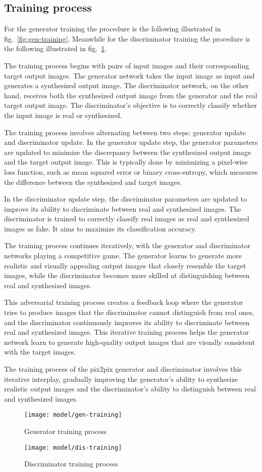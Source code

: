 \subsection{Training process}\label{subsec:training-process}
For the generator training the procedure is the following illustrated in fig.~\ref{fig:gen-training}, Meanwhile for the discriminator training the procedure is the following illustrated in fig.~\ref{fig:dis-training}.
\par
The training process begins with pairs of input images and their corresponding target output images. 
The generator network takes the input image as input and generates a synthesized output image. 
The discriminator network, on the other hand, receives both the synthesized output image from the generator and the real target output image. 
The discriminator's objective is to correctly classify whether the input image is real or synthesized.
\par
The training process involves alternating between two steps: generator update and discriminator update. 
In the generator update step, the generator parameters are updated to minimize the discrepancy between the synthesized output image and the target output image. 
This is typically done by minimizing a pixel-wise loss function, such as mean squared error or binary cross-entropy, which measures the difference between the synthesized and target images.
\par 
In the discriminator update step, the discriminator parameters are updated to improve its ability to discriminate between real and synthesized images. 
The discriminator is trained to correctly classify real images as real and synthesized images as fake. It aims to maximize its classification accuracy.
\par
The training process continues iteratively, with the generator and discriminator networks playing a competitive game. 
The generator learns to generate more realistic and visually appealing output images that closely resemble the target images, while the discriminator becomes more skilled at distinguishing between real and synthesized images.
\par
This adversarial training process creates a feedback loop where the generator tries to produce images that the discriminator cannot distinguish from real ones, and the discriminator continuously improves its ability to discriminate between real and synthesized images. 
This iterative training process helps the generator network learn to generate high-quality output images that are visually consistent with the target images.
\par
The training process of the pix2pix generator and discriminator involves this iterative interplay, gradually improving the generator's ability to synthesize realistic output images and the discriminator's ability to distinguish between real and synthesized images.
\begin{figure}[H]
    \centering
    \texttt{[image: model/gen-training]}
    \caption{Generator training process}\label{fig:gen-training}
    \texttt{[image: model/dis-training]}
    \caption{Discriminator training process}\label{fig:dis-training}
\end{figure}
